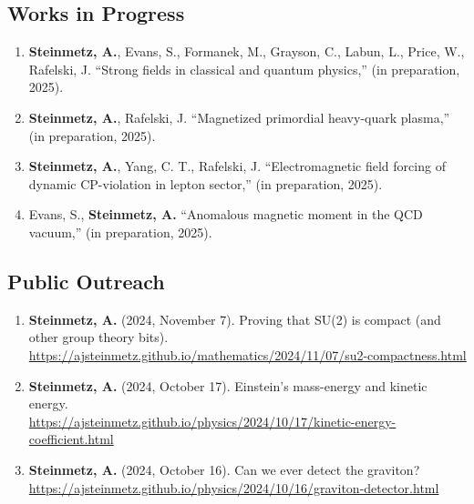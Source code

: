 \documentclass[11pt]{article}
\begin{document}
\subsection*{Works in Progress}
\begin{enumerate}[leftmargin=*,nosep]
    \item \textbf{Steinmetz, A.}, Evans, S., Formanek, M., Grayson, C., Labun, L., Price, W., Rafelski, J. ``Strong fields in classical and quantum physics,'' (in preparation, 2025).
    \item \textbf{Steinmetz, A.}, Rafelski, J. ``Magnetized primordial heavy-quark plasma,'' (in preparation, 2025).
    \item \textbf{Steinmetz, A.}, Yang, C. T., Rafelski, J. ``Electromagnetic field forcing of dynamic CP-violation in lepton sector,'' (in preparation, 2025).
    \item Evans, S., \textbf{Steinmetz, A.} ``Anomalous magnetic moment in the QCD vacuum,'' (in preparation, 2025).
\end{enumerate}

\subsection*{Public Outreach}
\begin{enumerate}[leftmargin=*,nosep]
    \item \textbf{Steinmetz, A.} (2024, November 7). Proving that SU(2) is compact (and other group theory bits). \href{https://ajsteinmetz.github.io/mathematics/2024/11/07/su2-compactness.html}{https://ajsteinmetz.github.io/mathematics/2024/11/07/su2-compactness.html}
    \item \textbf{Steinmetz, A.} (2024, October 17). Einstein’s mass-energy and kinetic energy.\\ \href{https://ajsteinmetz.github.io/physics/2024/10/17/kinetic-energy-coefficient.html}{https://ajsteinmetz.github.io/physics/2024/10/17/kinetic-energy-coefficient.html}
    \item \textbf{Steinmetz, A.} (2024, October 16). Can we ever detect the graviton?\\ \href{https://ajsteinmetz.github.io/physics/2024/10/16/graviton-detector.html}{https://ajsteinmetz.github.io/physics/2024/10/16/graviton-detector.html}
\end{enumerate}
\end{document}
